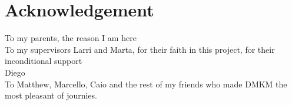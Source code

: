 \section*{Acknowledgement}

To my parents, the reason I am here\\

To my supervisors Larri and Marta, for their faith in this project, for their inconditional support \\

Diego\\

To Matthew, Marcello, Caio and the rest of my friends who made DMKM the most pleasant of journies. \\
